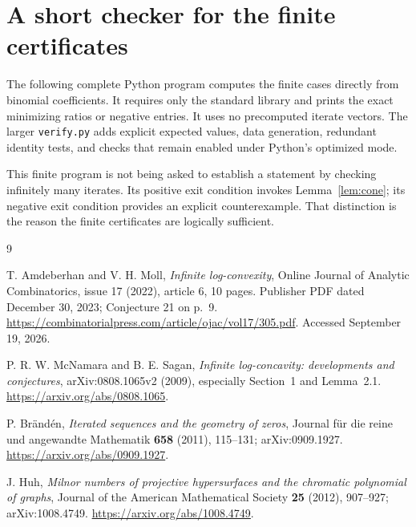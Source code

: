 \documentclass[11pt,a4paper]{article}
\theoremstyle{definition}
\begin{document}
\FloatBarrier
\section{A short checker for the finite certificates}\label{app:code}

The following complete Python program computes the finite cases directly
from binomial coefficients. It requires only the standard library and
prints the exact minimizing ratios or negative entries. It uses no
precomputed iterate vectors. The larger \texttt{verify.py} adds
explicit expected values, data generation, redundant identity tests,
and checks that remain enabled under Python's optimized mode.



This finite program is not being asked to establish a statement by
checking infinitely many iterates. Its positive exit condition invokes
Lemma~\ref{lem:cone}; its negative exit condition provides an explicit
counterexample. That distinction is the reason the finite certificates
are logically sufficient.

\begin{thebibliography}{9}

T. Amdeberhan and V. H. Moll,
\emph{Infinite log-convexity},
Online Journal of Analytic Combinatorics, issue 17 (2022), article 6,
10 pages. Publisher PDF dated December 30, 2023; Conjecture 21 on p.~9.
\url{https://combinatorialpress.com/article/ojac/vol17/305.pdf}.
Accessed September 19, 2026.

P. R. W. McNamara and B. E. Sagan,
\emph{Infinite log-concavity: developments and conjectures},
arXiv:0808.1065v2 (2009), especially Section~1 and Lemma~2.1.
\url{https://arxiv.org/abs/0808.1065}.

P. Br\"and\'en,
\emph{Iterated sequences and the geometry of zeros},
Journal f\"ur die reine und angewandte Mathematik \textbf{658} (2011),
115--131; arXiv:0909.1927.
\url{https://arxiv.org/abs/0909.1927}.

J. Huh,
\emph{Milnor numbers of projective hypersurfaces and the chromatic
polynomial of graphs},
Journal of the American Mathematical Society \textbf{25} (2012),
907--927; arXiv:1008.4749.
\url{https://arxiv.org/abs/1008.4749}.

\end{thebibliography}
\end{document}
